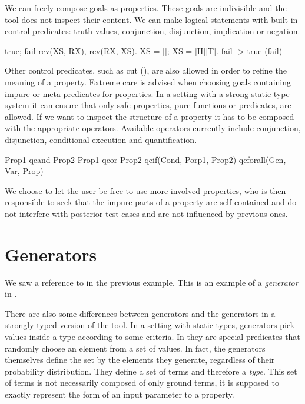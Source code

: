 We can freely compose \Prolog{} goals as properties.
%
These goals are indivisible and the tool does not inspect their content.
%
We can make logical statements with built-in control predicates:
truth values, conjunction, disjunction, implication or negation.
%
\begin{yapcode}
   true; fail
   rev(XS, RX), rev(RX, XS).
   XS = []; XS = [H||T].
   fail -> true
   \+(fail)
\end{yapcode}
%
Other control predicates, such as cut (\yap{!}), are also allowed in
order to refine the meaning of a property.
%
Extreme care is advised when choosing goals containing impure or
meta-predicates for properties.
%
In a setting with a strong static type system it can ensure that only
safe properties, pure functions or predicates, are allowed.
%
If we want \plqc{} to inspect the structure of a property it has to be
composed with the appropriate operators.
%
Available operators currently include conjunction, disjunction,
conditional execution and quantification.
%
\begin{yapcode}
   Prop1 qcand Prop2
   Prop1 qcor Prop2
   qcif(Cond, Porp1, Prop2)
   qcforall(Gen, Var, Prop)
\end{yapcode}
%
We choose to let the user be free to use more involved properties, who
is then responsible to seek that the impure parts of a property are self
contained and do not interfere with posterior test cases and are not
influenced by previous ones.


\section{Generators}
\label{sec:generators}

We saw a reference to  in the previous example.
%
This is an example of a \emph{generator} in \plqc{}.



There are also some differences between \plqc{} generators and the
generators in a strongly typed version of the tool.
%
In a setting with static types, generators pick values inside a type
according to some criteria.
%
In \plqc{} they are special predicates that randomly choose an element
from a set of values.
%
In fact, the generators themselves define the set by the elements
they generate, regardless of their probability distribution.
%
They define a set of terms and therefore a \emph{type}.
%
This set of terms is not necessarily composed of only ground terms, it
is supposed to exactly represent the form of an input parameter to a
property.


